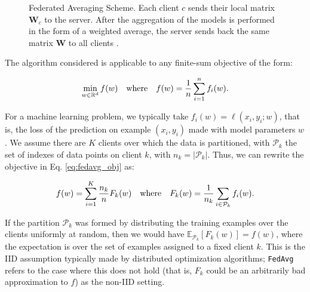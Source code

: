 \begin{figure}[H]\label{fig:fedavg}
\centering
{}
\caption{Federated Averaging Scheme. Each client $c$ sends their local matrix $\textbf{W}_c$ to the server. After the aggregation of the models is performed in the form of a weighted average, the server sends back the same matrix $\textbf{W}$ to all clients \cite{bacciu2021federated}.}
\end{figure}

The algorithm considered is applicable to any finite-sum objective of the form:

\begin{equation}\label{eq:fedavg_obj}
    \min_{w\in\mathbb{R}^d}f(w) \textup{\quad where\quad} f(w)=\frac{1}{n}\sum_{i=1}^{n}f_i(w).
\end{equation}

For a machine learning problem, we typically take $f_i(w)=\ell(x_i,y_i;w)$, that is, the loss of the prediction on example $(x_i,y_i)$ made with model parameters $w$. We assume there are $K$ clients over which the data is partitioned, with $\mathcal{P}_k$ the set of indexes of data points on client $k$, with $n_k=\left| \mathcal{P}_k \right|$. Thus, we can rewrite the objective in Eq. \ref{eq:fedavg_obj} as:

\begin{equation}
    f(w)=\sum_{i=1}^{K}\frac{n_k}{n}F_k(w) \text{\quad where\quad} F_k(w)=\frac{1}{n_k}\sum_{i\in\mathcal{P}_k}f_i(w).
\end{equation}

If the partition $\mathcal{P}_k$ was formed by distributing the training examples over the clients uniformly at random, then we would have $\mathbb{E}_{\mathcal{P}_k}\left[ F_k(w) \right]=f(w)$, where the expectation is over the set of examples assigned to a fixed client $k$. This is the IID assumption typically made by distributed optimization algorithms; \texttt{FedAvg} refers to the case where this does not hold (that is, $F_k$ could be an arbitrarily bad approximation to $f$) as the non-IID setting. \\

